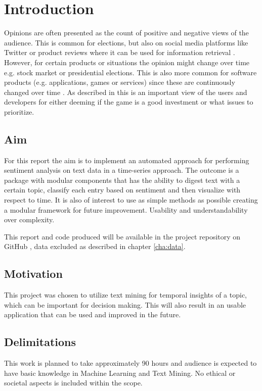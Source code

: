 \chapter{Introduction}
\label{cha:introduction}


Opinions are often presented as the count of positive and negative views of the audience. This is common for elections, 
but also on social media platforms like Twitter or product reviews where it can be used for information retrieval \cite{twitter_mining}. 
However, for certain products or situations the opinion might change over time e.g. stock market or presidential elections. 
This is also more common for software products (e.g. applications, games or services) since these are continuously changed over time \cite{steam_reviews}.
As described in \cite{steam_reviews} this is an important view of the users and developers for either deeming if the game is a good investment or what 
issues to prioritize.




\section{Aim}
\label{sec:aim}

For this report the aim is to implement an automated approach for performing sentiment analysis on text data in a time-series approach. 
The outcome is a package with modular components that has the ability to digest text with a certain topic, classify each entry based on sentiment and then visualize with respect to time.
It is also of interest to use as simple methods as possible creating a modular framework for future improvement. 
Usability and understandability over complexity.

This report and code produced will be available in the project repository on GitHub \cite{repository}, data excluded as described in chapter \autoref{cha:data}.


\section{Motivation}
\label{sec:motivation}

This project was chosen to utilize text mining for temporal insights of a topic, which can be important for decision making. This will also result in an usable application 
that can be used and improved in the future. 


\section{Delimitations}
\label{sec:delimitations}


This work is planned to take approximately 90 hours and audience is expected to have basic knowledge in Machine Learning and Text Mining. 
No ethical or societal aspects is included within the scope.